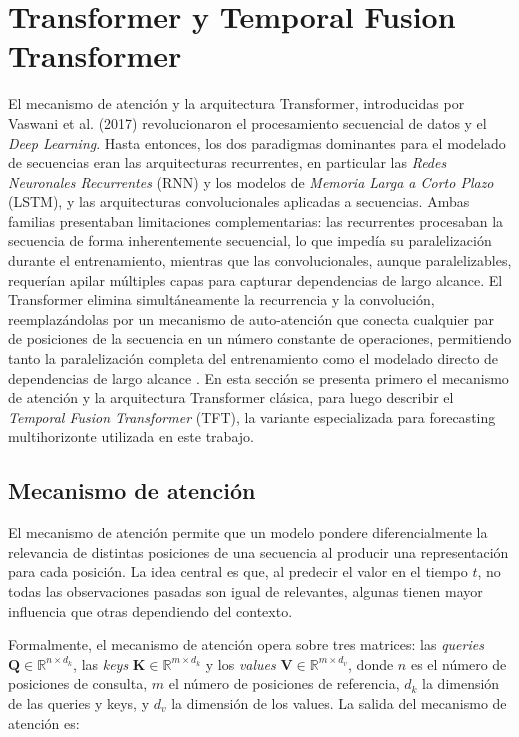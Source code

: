 \section{Transformer y Temporal Fusion Transformer}

El mecanismo de atención y la arquitectura Transformer, introducidas por Vaswani et al. (2017) \cite{Vaswani2017Attention} revolucionaron el procesamiento secuencial de datos y el \textit{Deep Learning}. Hasta entonces, los dos paradigmas dominantes para el modelado de secuencias eran las arquitecturas recurrentes, en particular las \textit{Redes Neuronales Recurrentes} (RNN) y los modelos de \textit{Memoria Larga a Corto Plazo} (LSTM), y las arquitecturas convolucionales aplicadas a secuencias. Ambas familias presentaban limitaciones complementarias: las recurrentes procesaban la secuencia de forma inherentemente secuencial, lo que impedía su paralelización durante el entrenamiento, mientras que las convolucionales, aunque paralelizables, requerían apilar múltiples capas para capturar dependencias de largo alcance. El Transformer elimina simultáneamente la recurrencia y la convolución, reemplazándolas por un mecanismo de auto-atención que conecta cualquier par de posiciones de la secuencia en un número constante de operaciones, permitiendo tanto la paralelización completa del entrenamiento como el modelado directo de dependencias de largo alcance \cite{Vaswani2017Attention}. En esta sección se presenta primero el mecanismo de atención y la arquitectura Transformer clásica, para luego describir el \textit{Temporal Fusion Transformer} (TFT), la variante especializada para forecasting multihorizonte utilizada en este trabajo.

\subsection{Mecanismo de atención}

El mecanismo de atención permite que un modelo pondere diferencialmente la relevancia de distintas posiciones de una secuencia al producir una representación para cada posición. La idea central es que, al predecir el valor en el tiempo $t$, no todas las observaciones pasadas son igual de relevantes, algunas tienen mayor influencia que otras dependiendo del contexto.

Formalmente, el mecanismo de atención opera sobre tres matrices: las \textit{queries} $\mathbf{Q} \in \mathbb{R}^{n \times d_k}$, las \textit{keys} $\mathbf{K} \in \mathbb{R}^{m \times d_k}$ y los \textit{values} $\mathbf{V} \in \mathbb{R}^{m \times d_v}$, donde $n$ es el número de posiciones de consulta, $m$ el número de posiciones de referencia, $d_k$ la dimensión de las queries y keys, y $d_v$ la dimensión de los values. La salida del mecanismo de atención es:

